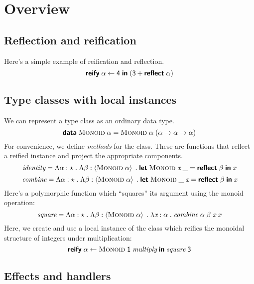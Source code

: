 \section{Overview}

  \subsection{Reflection and reification}

    Here's a simple example of reification and reflection.
    \[ \eReify{\eA}{\numberName{4}}{\parens{\numberName{3} + \eReflect{\eA}}} \]

  \subsection{Type classes with local instances}

    We can represent a type class as an ordinary data type.
    \[ \eData{\tMonoid{\eA}}{\eMonoid{\eA}{\parens{\tArrow{\eA}{\tArrow{\eA}{\eA}}}}} \]
    For convenience, we define \emph{methods} for the class. These are functions that reflect a reified instance and project the appropriate components.
    \[ \eIdentity = \eTAbs{\eA}{\kType}{\eTAbs{\eB}{\kProxy{\tMonoid{\eA}}}{\eLet{\eMonoid{\eX}{\wildcard}}{\eReflect{\eB}}{\eX}}} \]
    \[ \eCombine = \eTAbs{\eA}{\kType}{\eTAbs{\eB}{\kProxy{\tMonoid{\eA}}}{\eLet{\eMonoid{\wildcard}{\eX}}{\eReflect{\eB}}{\eX}}} \]
    Here's a polymorphic function which ``squares'' its argument using the monoid operation:
    \[ \eSquare = \eTAbs{\eA}{\kType}{\eTAbs{\eB}{\kProxy{\tMonoid{\eA}}}{\eAbs{\eX}{\eA}{\eApp{\eApp{\eTApp{\eTApp{\eCombine}{\eA}}{\eB}}{\eX}}{\eX}}}} \]
    Here, we create and use a local instance of the class which reifies the monoidal structure of integers under multiplication:
    \[ \eReify{\eA}{\eMonoid{\numberName{1}}{\eMultiply}}{\eApp{\eSquare}{\numberName{3}}} \]

  \subsection{Effects and handlers}
